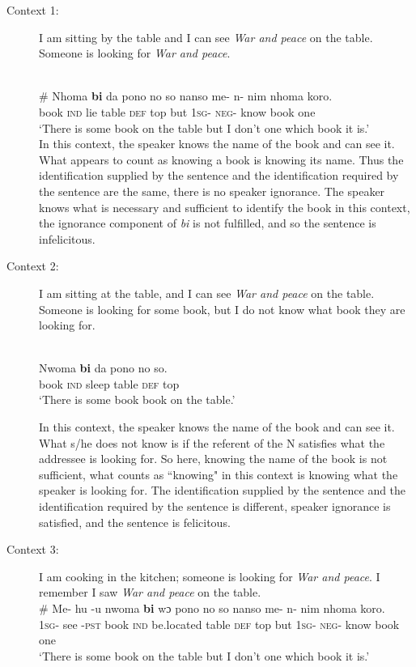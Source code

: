 \documentclass[output=paper,modfonts,nonflat,draftmode]{langsci/langscibook}
\begin{document}
\begin{description}
\item[Context 1:] I am sitting by the table and I can see \emph{War and peace} on the table. Someone is looking for \emph{War and peace}.

\ea\label{owusu:ex00}\\
\gll \# Nhoma \textbf{bi} da pono no so nanso me- n- nim nhoma koro.\\
	     {} book \textsc{ind}  lie table \textsc{def}  top but \textsc{1sg}- \textsc{neg}- know book one\\

\glt `There is some book on the table but I don't one which book it is.'\\

 \z  In this context, the speaker knows the name of the book and can see it. What appears to count as knowing a book is knowing its name. Thus the identification supplied by the sentence and the identification required by the sentence are the same, there is no speaker ignorance. The speaker knows what is necessary and sufficient to identify the book in this context, the ignorance component of \emph{bi} is not fulfilled, and so the sentence is infelicitous.

\item[Context 2:] I am sitting at the table, and I can see \emph{War and peace} on the table. Someone is looking for some book, but I do not know what book they are looking for.  

\ea\label{owusu:ex62}\\
\gll Nwoma \textbf{bi} da pono no so.\\
	      book \textsc{ind}  sleep table \textsc{def} top\\

\glt `There is some book book on the table.'

 \z In this context, the speaker knows the name of the book and can see it. What s/he does not know is if the referent of the N satisfies what the addressee is looking for. So here, knowing the name of the book is not sufficient, what counts as ``knowing" in this context is knowing what the speaker is looking for.  The identification supplied by the sentence and the identification required by the sentence is different, speaker ignorance is satisfied, and the sentence is felicitous.
 
\item[Context 3:] I am cooking in the kitchen; someone is looking for \emph{War and peace}. I remember I saw \emph{War and peace} on the table.
\ea\label{owusu:ex62a}\\
\gll \# Me- hu -u nwoma \textbf{bi} wɔ pono no so nanso me- n- nim nhoma koro.\\
	     {} \textsc{1sg}- see -\textsc{pst}  book \textsc{ind}  be.located table \textsc{def}  top but \textsc{1sg}- \textsc{neg}- know book one\\
\glt `There is some book on the table but I don't one which book it is.'


\end{description}
\end{document}
